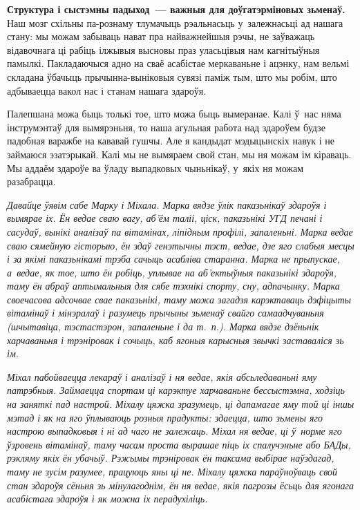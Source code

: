 \textbf{Структура і сыстэмны падыход~--- важныя для доўгатэрміновых зьменаў.} Наш мозг схільны па-рознаму тлумачыць рэальнасьць у~залежнасьці ад нашага стану: мы можам забываць нават пра найважнейшыя рэчы, не заўважаць відавочнага ці рабіць ілжывыя высновы праз уласьцівыя нам кагнітыўныя памылкі. Пакладаючыся адно на сваё асабістае меркаваньне і ацэнку, нам вельмі складана ўбачыць прычынна-выніковыя сувязі паміж тым, што мы робім, што адбываецца вакол нас і станам нашага здароўя.

Палепшана можа быць толькі тое, што можа быць вымеранае. Калі ў~нас няма інструмэнтаў для вымярэньня, то наша агульная работа над здароўем будзе падобная варажбе на кававай гушчы. Але я кандыдат мэдыцынскіх навук і не займаюся эзатэрыкай. Калі мы не вымяраем свой стан, мы ня можам ім кіраваць. Мы аддаём здароўе ва ўладу выпадковых чыньнікаў, у~якіх ня можам разабрацца. 


\emph{Давайце ўявім сабе Марку і Міхала. Марка вядзе ўлік паказьнікаў здароўя і вымярае іх. Ён ведае сваю вагу, аб'ём таліі, ціск, паказьнікі УГД печані і сасудаў, вынікі аналізаў па вітамінах, ліпідным профілі, запаленьні. Марка ведае сваю сямейную гісторыю, ён здаў генэтычны тэст, ведае, дзе яго слабыя месцы і за якімі паказьнікамі трэба сачыць асабліва старанна. Марка не прыпускае, а~ведае, як тое, што ён робіць, уплывае на аб'ектыўныя паказьнікі здароўя, таму ён абраў аптымальныя для сябе тэхнікі спорту, сну, адпачынку. Марка своечасова адсочвае свае паказьнікі, таму можа загадзя карэктаваць дэфіцыты вітамінаў і мінэралаў і разумець прычыны зьменаў свайго самаадчуваньня (шчытавіца, тэстастэрон, запаленьне і да т.~п.). Марка вядзе дзёньнік харчаваньня і трэніровак і сочыць, каб ягоныя карысныя звычкі заставаліся зь ім.}

\emph{Міхал пабойваецца лекараў і аналізаў і ня ведае, якія абсьледаваньні яму патрэбныя. Займаецца спортам ці карэктуе харчаваньне бессыстэмна, ходзіць на заняткі пад настрой. Міхалу цяжка зразумець, ці дапамагае яму той ці іншы мэтад і як на яго ўплываюць розныя прадукты: здаецца, што зьмены яго настрою выпадковыя і ні ад чаго не залежаць. Міхал ня ведае, ці ў~норме яго ўзровень вітамінаў, таму часам проста вырашае піць іх спалучэньне або БАДы, рэкляму якіх ён убачыў. Рэжымы трэніровак ён таксама выбірае наўздагад, таму не зусім разумее, працуюць яны ці не. Міхалу цяжка параўноўваць свой стан здароўя сёньня зь мінулагоднім, ён ня ведае, якія пагрозы ёсьць для ягонага асабістага здароўя і як можна іх перадухіліць.}

